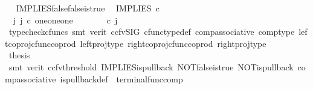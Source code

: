\begin{isabellebody}
\isamarkupfalse%
%
\endisatagproof
{\isafoldproof}%
%
\isadelimproof
\ \isanewline
%
\endisadelimproof
\isanewline
{}\isamarkupfalse%
\ IMPLIES{\isacharunderscore}{\kern0pt}false{\isacharunderscore}{\kern0pt}false{\isacharunderscore}{\kern0pt}is{\isacharunderscore}{\kern0pt}true{\isacharcolon}{\kern0pt}\isanewline
\ \ {\isachardoublequoteopen}IMPLIES\ {\isasymcirc}\isactrlsub c\ \ {\isasymlangle}{\isasymf}{\isacharcomma}{\kern0pt}{\isasymf}{\isasymrangle}\ {\isacharequal}{\kern0pt}\ {\isasymt}{\isachardoublequoteclose}\isanewline
%
\isadelimproof
%
\endisadelimproof
%
\isatagproof
{}\isamarkupfalse%
\ {\isacharminus}{\kern0pt}\ \ \ \isanewline
\ \ \isamarkupfalse%
\ {\isachardoublequoteopen}{\isasymexists}\ j{\isachardot}{\kern0pt}\ j\ {\isasymin}\isactrlsub c\ one{\isasymCoprod}{\isacharparenleft}{\kern0pt}one{\isasymCoprod}one{\isacharparenright}{\kern0pt}\ {\isasymand}\ {\isacharparenleft}{\kern0pt}{\isasymlangle}{\isasymt}{\isacharcomma}{\kern0pt}\ {\isasymt}{\isasymrangle}{\isasymamalg}\ {\isacharparenleft}{\kern0pt}{\isasymlangle}{\isasymf}{\isacharcomma}{\kern0pt}\ {\isasymf}{\isasymrangle}\ {\isasymamalg}{\isasymlangle}{\isasymf}{\isacharcomma}{\kern0pt}\ {\isasymt}{\isasymrangle}{\isacharparenright}{\kern0pt}{\isacharparenright}{\kern0pt}\ {\isasymcirc}\isactrlsub c\ j\ \ {\isacharequal}{\kern0pt}\ {\isasymlangle}{\isasymf}{\isacharcomma}{\kern0pt}{\isasymf}{\isasymrangle}{\isachardoublequoteclose}\isanewline
\ \ \ \ \isamarkupfalse%
\ {\isacharparenleft}{\kern0pt}typecheck{\isacharunderscore}{\kern0pt}cfuncs{\isacharcomma}{\kern0pt}\ smt\ {\isacharparenleft}{\kern0pt}verit{\isacharcomma}{\kern0pt}\ ccfv{\isacharunderscore}{\kern0pt}SIG{\isacharparenright}{\kern0pt}\ cfunc{\isacharunderscore}{\kern0pt}type{\isacharunderscore}{\kern0pt}def\ comp{\isacharunderscore}{\kern0pt}associative\ comp{\isacharunderscore}{\kern0pt}type\ left{\isacharunderscore}{\kern0pt}coproj{\isacharunderscore}{\kern0pt}cfunc{\isacharunderscore}{\kern0pt}coprod\ left{\isacharunderscore}{\kern0pt}proj{\isacharunderscore}{\kern0pt}type\ right{\isacharunderscore}{\kern0pt}coproj{\isacharunderscore}{\kern0pt}cfunc{\isacharunderscore}{\kern0pt}coprod\ right{\isacharunderscore}{\kern0pt}proj{\isacharunderscore}{\kern0pt}type{\isacharparenright}{\kern0pt}\isanewline
\ \ \isamarkupfalse%
\ \isamarkupfalse%
\ {\isacharquery}{\kern0pt}thesis\isanewline
\ \ \ \ \isamarkupfalse%
\ {\isacharparenleft}{\kern0pt}smt\ {\isacharparenleft}{\kern0pt}verit{\isacharcomma}{\kern0pt}\ ccfv{\isacharunderscore}{\kern0pt}threshold{\isacharparenright}{\kern0pt}\ IMPLIES{\isacharunderscore}{\kern0pt}is{\isacharunderscore}{\kern0pt}pullback\ NOT{\isacharunderscore}{\kern0pt}false{\isacharunderscore}{\kern0pt}is{\isacharunderscore}{\kern0pt}true\ NOT{\isacharunderscore}{\kern0pt}is{\isacharunderscore}{\kern0pt}pullback\ comp{\isacharunderscore}{\kern0pt}associative{}\ is{\isacharunderscore}{\kern0pt}pullback{\isacharunderscore}{\kern0pt}def\ \ terminal{\isacharunderscore}{\kern0pt}func{\isacharunderscore}{\kern0pt}comp{\isacharparenright}{\kern0pt}\isanewline

\end{isabellebody}
